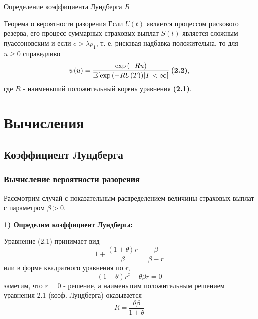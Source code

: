 \documentclass[10pt]{beamer}
\newcommand\Exp{{\rm exp \,}}
\begin{document}
\begin{frame}
\begin{center}

    Определение коэффициента Лундберга $R$
\end{center}
\end{frame}

\begin{frame}
\begin{block}{Теорема о вероятности разорения}
Если $U(t)$ является процессом рискового резерва, его процесс суммарных страховых выплат $S(t)$ является сложным пуассоновским и если $c > \lambda p_{1}$, т. е. рисковая надбавка положительна, то для $u \geq 0$ справедливо $$
    \psi(u) = \frac{\Exp(-Ru)}{\mathbb{E}[\Exp(-RU(T))|T < \infty]} \: \textbf{(2.2)}, $$ где $R$ - наименьший положительный корень уравнения \textbf{(2.1)}.
\end{block}

\end{frame}


\section{Вычисления}
\subsection{Коэффициент Лундберга}
\begin{frame}
\frametitle{Вычисление вероятности разорения}
\noindent
Рассмотрим случай с показательным распределением величины страховых выплат с параметром $\beta > 0$.

\noindent
\textbf{1) Определим коэффициент Лундберга:}

\noindent
Уравнение (2.1) принимает вид
\begin{equation}
1 + \frac{(1 + \theta)r}{\beta}=\frac{\beta}{\beta-r}
\end{equation}
или в форме квадратного уравнения по $r$,
\begin{equation}
(1 + \theta)r^2 - \theta\beta r = 0
\end{equation}
заметим, что $r = 0$ - решение, а наименьшим положительным решением уравнения 2.1
(коэф. Лундберга) оказывается
\begin{equation}
R = \frac{\theta\beta}{1 + \theta}
\end{equation}
\end{frame}
\end{document}
